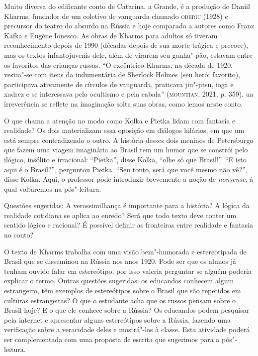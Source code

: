 \documentclass[11pt]{extarticle}
\begin{document}
Muito diversa do edificante conto de Catarina, a Grande, é a produção
de Daniil Kharms, fundador de um coletivo de vanguarda chamado \textsc{oberiu}
(1928) e precursor do teatro do absurdo na Rússia e hoje comparado a
autores como Franz Kafka e Eugène Ionesco. As obras de Kharms para
adultos só tiveram reconhecimento depois de 1990 (décadas depois de sua
morte trágica e precoce), mas os textos infantojuvenis dele, além de
virarem seu ganha"-pão, estavam entre os favoritos das crianças russas.
``O excêntrico Kharms, na década de 1920, vestia"-se com itens da
indumentária de Sherlock Holmes (seu herói favorito), participava
ativamente de círculos de vanguarda, praticava jiu"-jitsu, ioga e xadrez
e se interessava pelo ocultismo e pela cabala'' (\textsc{mountian}, 2021, p.
359). ua irreverência se reflete na imaginação solta suas obras, como
lemos neste conto.

\begin{figure}[ht!]
\end{figure}

O que chama a atenção no modo como Kolka e Pietka lidam com fantasia e
realidade? Os dois materializam essa oposição em diálogos hilários, em
que um está sempre contradizendo o outro. A história desses dois meninos
de Petersburgo que fazem uma viagem imaginária ao Brasil tem um humor
que se constrói pelo ilógico, insólito e irracional: ``Pietka'', disse
Kolka, ``olhe só que Brasil!''. ``E isto aqui é o Brasil?'', perguntou
Pietka. ``Seu tonto, será que você mesmo não vê?'', disse Kolka. Aqui, o
professor pode introduzir brevemente a noção de \emph{nonsense}, à qual
voltaremos na pós"-leitura.

Questões sugeridas: A verossimilhança é importante para a história? A
lógica da realidade cotidiana se aplica ao enredo? Será que todo texto
deve conter um sentido lógico e racional? É possível definir as
fronteiras entre realidade e fantasia no conto?

O texto de Kharms trabalha com uma visão bem"-humorada e estereotipada
de Brasil que se disseminou na Rússia nos anos 1920. Pode ser que os
alunos já tenham ouvido falar em estereótipo, por isso valeria perguntar
se alguém poderia explicar o termo. Outras questões sugeridas: os
educandos conhecem algum estrangeiro, têm exemplos de estereótipos sobre
o Brasil que são repetidos em culturas estrangeiras? O que o estudante
acha que os russos pensam sobre o Brasil hoje? E o que ele conhece sobre
a Rússia? Os educandos podem pesquisar pela internet e apresentar alguns
estereótipos sobre a Rússia, fazendo uma verificação sobre a veracidade
deles e mostrá"-los à classe. Esta atividade poderá ser complementada com
uma proposta de escrita que sugerimos para a pós"-leitura.
\end{document}
